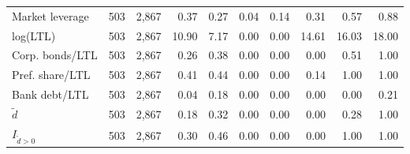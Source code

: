 \begin{threeparttable}
\begin{tabular}{lrrrrrrrrr}
Market leverage & 503 & 2,867 & 0.37 & 0.27 & 0.04 & 0.14 & 0.31 & 0.57 & 0.88 \\
log(LTL) & 503 & 2,867 & 10.90 & 7.17 & 0.00 & 0.00 & 14.61 & 16.03 & 18.00 \\
Corp. bonds/LTL & 503 & 2,867 & 0.26 & 0.38 & 0.00 & 0.00 & 0.00 & 0.51 & 1.00 \\
Pref. share/LTL & 503 & 2,867 & 0.41 & 0.44 & 0.00 & 0.00 & 0.14 & 1.00 & 1.00 \\
Bank debt/LTL & 503 & 2,867 & 0.04 & 0.18 & 0.00 & 0.00 & 0.00 & 0.00 & 0.21 \\
\ensuremath{\tilde{d}} & 503 & 2,867 & 0.18 & 0.32 & 0.00 & 0.00 & 0.00 & 0.28 & 1.00 \\
\ensuremath{I_{\tilde{d}>0}} & 503 & 2,867 & 0.30 & 0.46 & 0.00 & 0.00 & 0.00 & 1.00 & 1.00 \\
\bottomrule\end{tabular}\end{threeparttable}
